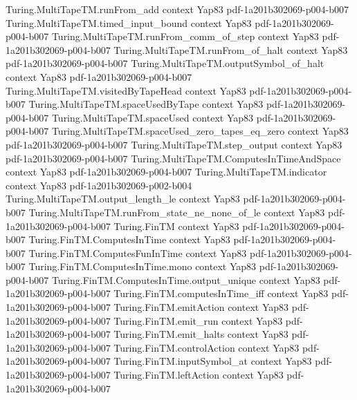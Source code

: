 \begin{theorem}
\proofstep
  {Turing.MultiTapeTM.runFrom_add}
  {context}
  {Yap83}
  {pdf-1a201b302069-p004-b007}
\proofstep
  {Turing.MultiTapeTM.timed_input_bound}
  {context}
  {Yap83}
  {pdf-1a201b302069-p004-b007}
\proofstep
  {Turing.MultiTapeTM.runFrom_comm_of_step}
  {context}
  {Yap83}
  {pdf-1a201b302069-p004-b007}
\proofstep
  {Turing.MultiTapeTM.runFrom_of_halt}
  {context}
  {Yap83}
  {pdf-1a201b302069-p004-b007}
\proofstep
  {Turing.MultiTapeTM.outputSymbol_of_halt}
  {context}
  {Yap83}
  {pdf-1a201b302069-p004-b007}
\proofstep
  {Turing.MultiTapeTM.visitedByTapeHead}
  {context}
  {Yap83}
  {pdf-1a201b302069-p004-b007}
\proofstep
  {Turing.MultiTapeTM.spaceUsedByTape}
  {context}
  {Yap83}
  {pdf-1a201b302069-p004-b007}
\proofstep
  {Turing.MultiTapeTM.spaceUsed}
  {context}
  {Yap83}
  {pdf-1a201b302069-p004-b007}
\proofstep
  {Turing.MultiTapeTM.spaceUsed_zero_tapes_eq_zero}
  {context}
  {Yap83}
  {pdf-1a201b302069-p004-b007}
\proofstep
  {Turing.MultiTapeTM.step_output}
  {context}
  {Yap83}
  {pdf-1a201b302069-p004-b007}
\proofstep
  {Turing.MultiTapeTM.ComputesInTimeAndSpace}
  {context}
  {Yap83}
  {pdf-1a201b302069-p004-b007}
\proofstep
  {Turing.MultiTapeTM.indicator}
  {context}
  {Yap83}
  {pdf-1a201b302069-p002-b004}
\proofstep
  {Turing.MultiTapeTM.output_length_le}
  {context}
  {Yap83}
  {pdf-1a201b302069-p004-b007}
\proofstep
  {Turing.MultiTapeTM.runFrom_state_ne_none_of_le}
  {context}
  {Yap83}
  {pdf-1a201b302069-p004-b007}
\proofstep
  {Turing.FinTM}
  {context}
  {Yap83}
  {pdf-1a201b302069-p004-b007}
\proofstep
  {Turing.FinTM.ComputesInTime}
  {context}
  {Yap83}
  {pdf-1a201b302069-p004-b007}
\proofstep
  {Turing.FinTM.ComputesFunInTime}
  {context}
  {Yap83}
  {pdf-1a201b302069-p004-b007}
\proofstep
  {Turing.FinTM.ComputesInTime.mono}
  {context}
  {Yap83}
  {pdf-1a201b302069-p004-b007}
\proofstep
  {Turing.FinTM.ComputesInTime.output_unique}
  {context}
  {Yap83}
  {pdf-1a201b302069-p004-b007}
\proofstep
  {Turing.FinTM.computesInTime_iff}
  {context}
  {Yap83}
  {pdf-1a201b302069-p004-b007}
\proofstep
  {Turing.FinTM.emitAction}
  {context}
  {Yap83}
  {pdf-1a201b302069-p004-b007}
\proofstep
  {Turing.FinTM.emit_run}
  {context}
  {Yap83}
  {pdf-1a201b302069-p004-b007}
\proofstep
  {Turing.FinTM.emit_halts}
  {context}
  {Yap83}
  {pdf-1a201b302069-p004-b007}
\proofstep
  {Turing.FinTM.controlAction}
  {context}
  {Yap83}
  {pdf-1a201b302069-p004-b007}
\proofstep
  {Turing.FinTM.inputSymbol_at}
  {context}
  {Yap83}
  {pdf-1a201b302069-p004-b007}
\proofstep
  {Turing.FinTM.leftAction}
  {context}
  {Yap83}
  {pdf-1a201b302069-p004-b007}

\end{theorem}
